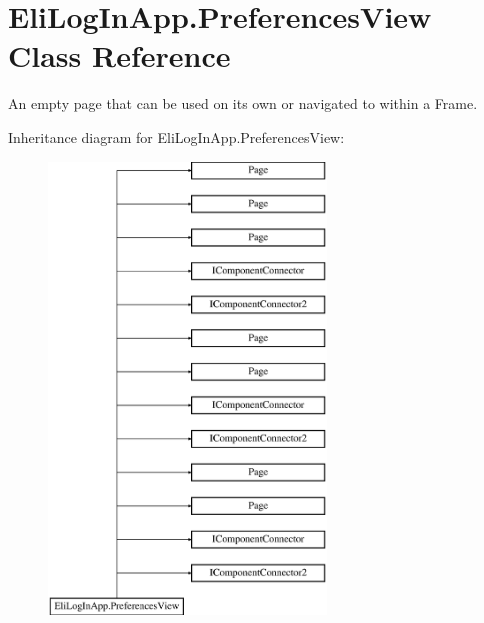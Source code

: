 \hypertarget{class_eli_log_in_app_1_1_preferences_view}{}\section{Eli\+Log\+In\+App.\+Preferences\+View Class Reference}
\label{class_eli_log_in_app_1_1_preferences_view}


An empty page that can be used on its own or navigated to within a Frame.  


Inheritance diagram for Eli\+Log\+In\+App.\+Preferences\+View\+:\begin{figure}[H]
\begin{center}
\leavevmode
\includegraphics[height=12.000000cm]{d5/d39/class_eli_log_in_app_1_1_preferences_view}
\end{center}
\end{figure}

